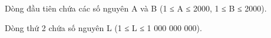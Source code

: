 Dòng đầu tiên chứa các số nguyên A và B (1 ≤ A ≤ 2000, 1 ≤ B ≤ 2000).  

   Dòng thứ 2 chứa số nguyên L (1 ≤ L ≤ 1 000 000 000).